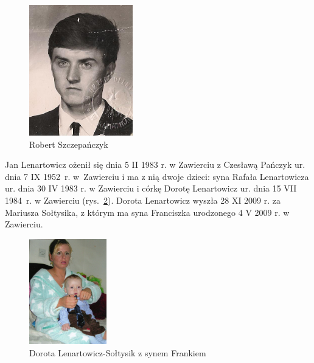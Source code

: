 \begin{figure}
	\begin{center}
		\includegraphics[width=0.4\textwidth]{zdjecia/robert_szczepanczyk.jpg}
		\caption{Robert Szczepańczyk}
		\label{rys:robert_szczepanczyk}
	\end{center}
\end{figure}

Jan Lenartowicz ożenił się dnia 5 II 1983 r. w Zawierciu z Czesławą Pańczyk ur. dnia 7 IX 1952~r. w~Zawierciu i ma z nią dwoje dzieci: syna Rafała Lenartowicza ur. dnia 30 IV 1983 r. w Zawierciu i córkę Dorotę Lenartowicz ur. dnia 15 VII 1984~r. w Zawierciu (rys.~\ref{rys:dorota_lenartowicz_z_synem_frankiem}). Dorota Lenartowicz wyszła 28 XI  2009 r. za Mariusza Sołtysika, z którym ma syna Franciszka urodzonego 4 V 2009 r. w Zawierciu.

\begin{figure}[!ht]
\begin{center}
\includegraphics[width=0.3\textwidth]{zdjecia/dorota_lenartowicz_z_synem_frankiem.jpg}
\caption{Dorota Lenartowicz-Sołtysik z synem Frankiem}
\label{rys:dorota_lenartowicz_z_synem_frankiem}
\end{center}
\end{figure}

